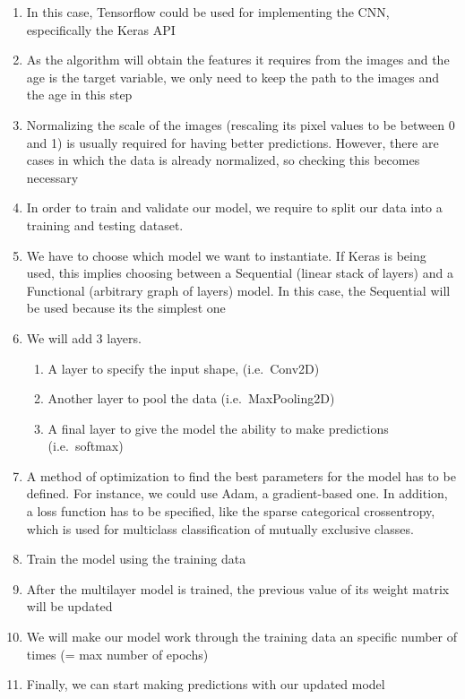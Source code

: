 \documentclass[11pt]{article}
\providecommand{\tightlist}{%
      \setlength{\itemsep}{0pt}\setlength{\parskip}{0pt}}
\begin{document}
    \begin{enumerate}
\def\labelenumi{\arabic{enumi}.}
\tightlist
\item
  In this case, Tensorflow could be used for implementing the CNN,
  especifically the Keras API
\item
  As the algorithm will obtain the features it requires from the images
  and the age is the target variable, we only need to keep the path to
  the images and the age in this step
\item
  Normalizing the scale of the images (rescaling its pixel values to be
  between 0 and 1) is usually required for having better predictions.
  However, there are cases in which the data is already normalized, so
  checking this becomes necessary
\item
  In order to train and validate our model, we require to split our data
  into a training and testing dataset.
\item
  We have to choose which model we want to instantiate. If Keras is
  being used, this implies choosing between a Sequential (linear stack
  of layers) and a Functional (arbitrary graph of layers) model. In this
  case, the Sequential will be used because its the simplest one
\item
  We will add 3 layers.

  \begin{enumerate}
  \def\labelenumii{\arabic{enumii}.}
  \tightlist
  \item
    A layer to specify the input shape, (i.e.~Conv2D)
  \item
    Another layer to pool the data (i.e.~MaxPooling2D)
  \item
    A final layer to give the model the ability to make predictions
    (i.e.~softmax)
  \end{enumerate}
\item
  A method of optimization to find the best parameters for the model has
  to be defined. For instance, we could use Adam, a gradient-based one.
  In addition, a loss function has to be specified, like the sparse
  categorical crossentropy, which is used for multiclass classification
  of mutually exclusive classes.
\item
  Train the model using the training data
\item
  After the multilayer model is trained, the previous value of its
  weight matrix will be updated
\item
  We will make our model work through the training data an specific
  number of times (= max number of epochs)
\item
  Finally, we can start making predictions with our updated model
\end{enumerate}
\end{document}
